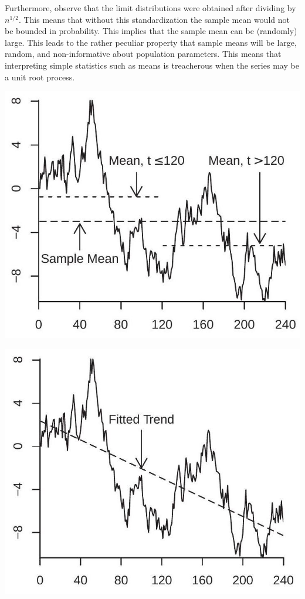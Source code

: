 \documentclass[10pt]{article}
\begin{document}
Furthermore, observe that the limit distributions were obtained after dividing by $n^{1 / 2}$. This means that without this standardization the sample mean would not be bounded in probability. This implies that the sample mean can be (randomly) large. This leads to the rather peculiar property that sample means will be large, random, and non-informative about population parameters. This means that interpreting simple statistics such as means is treacherous when the series may be a unit root process.

\includegraphics[max width=\textwidth]{2022_10_23_e99fc7c58db661c6f219g-08}

\includegraphics[max width=\textwidth]{2022_10_23_e99fc7c58db661c6f219g-08(1)}
\end{document}
